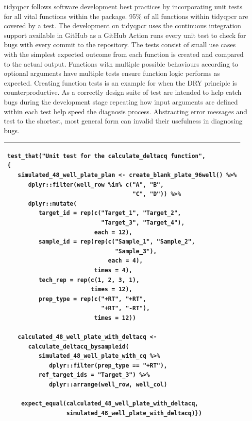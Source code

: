 \documentclass{SBCbookchapter}
\begin{document}
tidyqpcr follows software development best practices by incorporating unit tests for all vital functions within the package. 95\% of all functions within tidyqpcr are covered by a test. The development on tidyqpcr uses the continuous integration support available in GitHub as a GitHub Action runs every unit test to check for bugs with every commit to the repository. The tests consist of small use cases with the simplest expected outcome from each function is created and compared to the actual output. Functions with multiple possible behaviours according to optional arguments have multiple tests ensure function logic performs as expected. Creating function tests is an example for when the DRY principle is counterproductive. As a correctly design suite of test are intended to help catch bugs during the development stage repeating how input arguments are defined within each test help speed the diagnosis process. Abstracting error messages and test to the shortest, most general form can invalid their usefulness in diagnosing bugs.

\begin{center}
\begin{tabular}{| m{10cm} |}
\hline
\begin{lstlisting}
test_that("Unit test for the calculate_deltacq function",
{
   simulated_48_well_plate_plan <- create_blank_plate_96well() %>%
      dplyr::filter(well_row %in% c("A", "B",
                                    "C", "D")) %>%
      dplyr::mutate(
         target_id = rep(c("Target_1", "Target_2",
                           "Target_3", "Target_4"),
                         each = 12),
         sample_id = rep(rep(c("Sample_1", "Sample_2",
                               "Sample_3"),
                             each = 4),
                         times = 4),
         tech_rep = rep(c(1, 2, 3, 1),
                        times = 12),
         prep_type = rep(c("+RT", "+RT",
                           "+RT", "-RT"),
                         times = 12))

   calculated_48_well_plate_with_deltacq <- 
      calculate_deltacq_bysampleid(
         simulated_48_well_plate_with_cq %>%
            dplyr::filter(prep_type == "+RT"), 
         ref_target_ids = "Target_3") %>%
            dplyr::arrange(well_row, well_col)

    expect_equal(calculated_48_well_plate_with_deltacq,        
                 simulated_48_well_plate_with_deltacq)})
\end{lstlisting} \\
\hline
\end{tabular}
\end{center}
\end{document}
